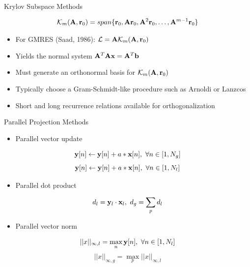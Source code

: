 \documentclass{beamer}
\begin{document}
\begin{frame}{Krylov Subspace Methods}

  \[
  \mathcal{K}_m(\mathbf{A},\mathbf{r}_0) = span\{\mathbf{r}_0, \mathbf{A}\mathbf{r}_0,
  \mathbf{A}^2\mathbf{r}_0, \dots, \mathbf{A}^{m-1}\mathbf{r}_0\}
  \]

  \begin{itemize}
  \item For GMRES (Saad, 1986): $\mathcal{L} = \mathbf{A}
    \mathcal{K}_m(\mathbf{A},\mathbf{r}_0)$
  \end{itemize}

  \medskip \medskip \medskip
  \small{
  \begin{itemize}
  \item Yields the normal system $\mathbf{A}^T\mathbf{A}\mathbf{x} =
    \mathbf{A}^T\mathbf{b}$
    \medskip
  \item Must generate an orthonormal basis for
    $\mathcal{K}_m(\mathbf{A},\mathbf{r}_0)$
    \medskip
  \item Typically choose a Gram-Schmidt-like procedure such as Arnoldi
    or Lanzcos
    \medskip
  \item Short and long recurrence relations available for
    orthogonalization
  \end{itemize}
  }

\end{frame}

\begin{frame}{Parallel Projection Methods}
  
  \begin{itemize}
  \item Parallel vector update
  \end{itemize}
  \[
  \mathbf{y}[n] \leftarrow \mathbf{y}[n] + a * \mathbf{x}[n],\ \forall n \in
     [1,N_g]
  \]
  \[
  \mathbf{y}[n] \leftarrow \mathbf{y}[n] + a * \mathbf{x}[n],\ \forall n \in
     [1,N_l]
  \]
  
  \medskip \medskip
  \begin{itemize}
  \item Parallel dot product
  \end{itemize}
  \[
  d_l = \mathbf{y}_l \cdot \mathbf{x}_l,\ d_g = \sum_p d_l
  \]

  \medskip \medskip
  \begin{itemize}
  \item Parallel vector norm
  \end{itemize}
  \[
  ||x||_{\infty,l} = \max_n \ve{y}[n],\ \forall n \in [1,N_l]
  \]
  \[
  ||x||_{\infty,g} = \max_p ||x||_{\infty,l}
  \]
  
\end{frame}
\end{document}
